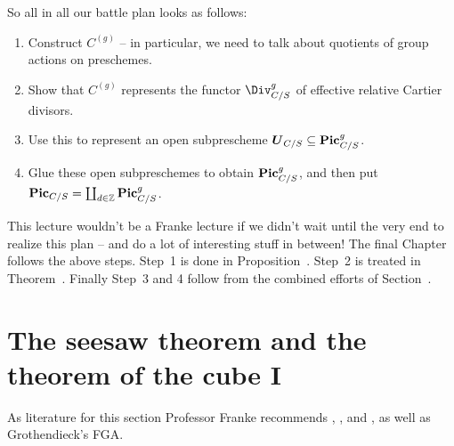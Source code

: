 \documentclass[a4paper,parskip=half,numbers=enddot, DIV=12]{scrreprt}
\begin{document}
So all in all our battle plan looks as follows:
\begin{enumerate}
	\item Construct $C^{(g)}$ -- in particular, we need to talk about quotients of group actions on preschemes.
	\item Show that $C^{(g)}$ represents the functor $\Div_{C/S}^g$ of  effective relative Cartier divisors.
	\item Use this to represent an open subprescheme $\boldsymbol{U}_{C/S}\subseteq \mathbf{Pic}_{C/S}^g$.
	\item Glue these open subpreschemes to obtain $\mathbf{Pic}_{C/S}^g$, and then put $\mathbf{Pic}_{C/S}=\coprod_{d\in\mathbb{Z}}\mathbf{Pic}_{C/S}^g$.
\end{enumerate}
This lecture wouldn't be a Franke lecture if we didn't wait until the very end to realize this plan -- and do a lot of interesting stuff in between! The final Chapter~ follows the above steps. Step~1 is done in Proposition~. Step~2 is treated in Theorem~. Finally Step~3 and 4 follow from the combined efforts of Section~.
\section{The seesaw theorem and the theorem of the cube I}
As literature for this section Professor Franke recommends \cite{mumford1974abelian}, \cite{cornell1986arithmetic}, and \cite{kleiman}, as well as Grothendieck's FGA.
\end{document}
